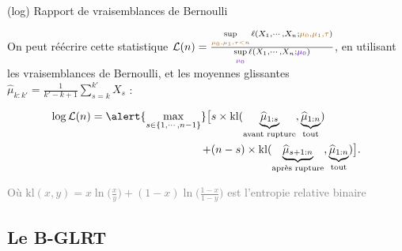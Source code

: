 \documentclass[11pt,french,ignorenonframetext,]{beamer}
\begin{document}
\begin{frame}{(log) Rapport de vraisemblances de Bernoulli}

  On peut réécrire cette statistique
  $\mathcal{L}(n) = \frac{\sup\limits_{\textcolor{gold}{\mu_0,\mu_1,\tau < n}}\ell(X_1,\cdots,X_n ; \textcolor{gold}{\mu_0,\mu_1,\tau})}{\sup\limits_{\textcolor{deeppurple}{\mu_0}}\ell(X_1,\cdots,X_n ;\textcolor{deeppurple}{\mu_0})}$,
  en utilisant les vraisemblances de Bernoulli, et les moyennes glissantes $\widehat{\mu}_{k:k'} = \frac{1}{k'-k+1} \sum\limits_{s=k}^{k'} X_s$ :

  \begin{align*}
    \log \mathcal{L}(n) = \alert{\max_{s \in \{1,\cdots,n-1\}}} \bigl[
      & s \times \mathrm{kl} (\underbrace{\widehat{\mu}_{1:s}}_{\text{avant rupture}},\underbrace{\widehat{\mu}_{1:n}}_{\text{tout}} ) \\
      + & (n-s) \times \mathrm{kl} (\underbrace{\widehat{\mu}_{s+1:n}}_{\text{après rupture}},\underbrace{\widehat{\mu}_{1:n}}_{\text{tout}} ) \bigr].
  \end{align*}

  \begin{small}
    \textcolor{gray}{Où $\mathrm{kl}(x,y) =x \ln\bigl(\frac{x}{y}\bigr) + (1-x)\ln\bigl(\frac{1-x}{1-y}\bigr)$ est l'entropie relative binaire}
  \end{small}

\end{frame}


\subsection{\hfill{}Le B-GLRT\hfill{}}
\end{document}
